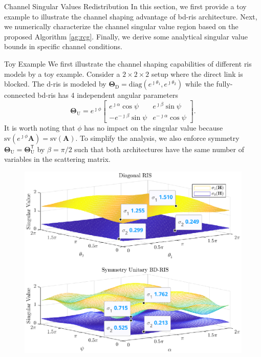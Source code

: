 \documentclass[journal]{IEEEtran}
\begin{document}
\begin{section}{Channel Singular Values Redistribution}
	\label{sc:singular_value}
	In this section, we first provide a toy example to illustrate the channel shaping advantage of \gls{bd}-\gls{ris} architecture.
	Next, we numerically characterize the channel singular value region based on the proposed Algorithm \ref{ag:rcg}.
	Finally, we derive some analytical singular value bounds in specific channel conditions.
	\begin{subsection}{Toy Example}\label{sc:toy_example}
		We first illustrate the channel shaping capabilities of different \gls{ris} models by a toy example.
		Consider a $2 \times 2 \times 2$ setup where the direct link is blocked.
		The \gls{d}-\gls{ris} is modeled by $\mathbf{\Theta}_\mathrm{D} = \mathrm{diag}(e^{\jmath \theta_1}, e^{\jmath \theta_2})$ while the fully-connected \gls{bd}-\gls{ris} has 4 independent angular parameters
		\begin{equation}
			\mathbf{\Theta}_\mathrm{U} = e^{\jmath \phi} \begin{bmatrix}
				e^{\jmath \alpha} \cos \psi  & e^{\jmath \beta} \sin \psi   \\
				-e^{-\jmath \beta} \sin \psi & e^{-\jmath \alpha} \cos \psi
			\end{bmatrix}.
			\label{eq:unitary_ris}
		\end{equation}
		It is worth noting that $\phi$ has no impact on the singular value because $\mathrm{sv}(e^{\jmath \phi} \mathbf{A}) = \mathrm{sv}(\mathbf{A})$.
		To simplify the analysis, we also enforce symmetry $\mathbf{\Theta}_\mathrm{U} = \mathbf{\Theta}_\mathrm{U}^\mathsf{T}$ by $\beta = \pi / 2$ such that both architectures have the same number of variables in the scattering matrix.
		\begin{figure}
			\centering
			\includegraphics[width=\columnwidth]{assets/simulation/singular_trend.eps}

\end{figure}
\end{subsection}
\end{section}
\end{document}
